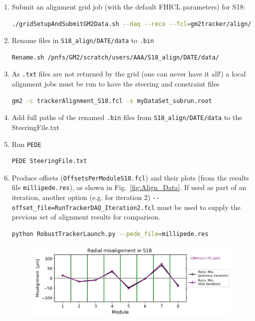\documentclass[12pt]{article}
\begin{document}
\begin{enumerate}
    \item Submit an alignment grid job (with the default FHICL parameters) for S18:
    \begin{lstlisting}[language=bash]
     ./gridSetupAndSubmitGM2Data.sh --daq --reco --fcl=gm2tracker/align/fcl/trackerAlignment_S18.fcl --localArea --output-dir=/pnfs/GM2/scratch/users/AAA/S18_align --sam-dataset=myDataSet --multipleroot --njobs=450 \end{lstlisting}
     \item Rename files in \verb!S18_align/DATE/data! to \verb!.bin!
     \begin{lstlisting}[language=bash] 
     Rename.sh /pnfs/GM2/scratch/users/AAA/S18_align/DATE/data/\end{lstlisting}
     \clearpage
     \item As \verb!.txt! files are not returned by the grid (one can never have it all!) a local alignment jobs must be run to have the steering and constraint files
     \begin{lstlisting}[language=bash] 
     gm2 -c trackerAlignment_S18.fcl -s myDataSet_subrun.root \end{lstlisting}
     \item Add full paths of the renamed \verb!.bin! files from \verb!S18_align/DATE/data! to the SteeringFile.txt
     \item Run \texttt{PEDE}
     \begin{lstlisting}[language=bash] 
     PEDE SteeringFile.txt \end{lstlisting}
     \item Produce offsets (\verb!OffsetsPerModuleS18.fcl!) and their plots (from the results file \verb!millipede.res!), as shown in Fig.~\ref{fig:Align_Data}. If used as part of an iteration, another option (e.g. for iteration 2) \lstinline{--offset_file=RunTrackerDAQ_Iteration2.fcl} must be used to supply the previous set of alignment results for comparison.
     \begin{lstlisting}[language=bash] 
     python RobustTrackerLaunch.py --pede_file=millipede.res \end{lstlisting}
     \begin{figure}[h!]
        \centering
        \includegraphics[width = 0.7\linewidth]{fig/Align_Data.png}

\end{figure}
\end{enumerate}
\end{document}
